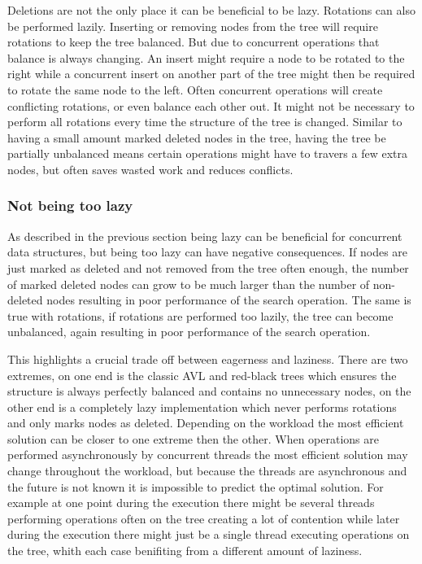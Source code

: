 \documentclass[10pt]{sigplanconf}
\begin{document}
Deletions are not the only place it can be beneficial to be lazy.
Rotations can also be performed lazily.
Inserting or removing nodes from the tree will require rotations to keep the tree balanced.
But due to concurrent operations that balance is always changing.
An insert might require a node to be rotated to the right while a concurrent insert on another part of the tree might then be required to rotate the same node to the left.
Often concurrent operations will create conflicting rotations, or even balance each other out.
It might not be necessary to perform all rotations every time the structure of the tree is changed.
Similar to having a small amount marked deleted nodes in the tree, having the tree be partially unbalanced means certain operations might have to travers a few extra nodes, but
often saves wasted work and reduces conflicts.

\subsubsection{Not being too lazy}
As described in the previous section being lazy can be beneficial for concurrent data structures, but being too lazy can have negative consequences.
If nodes are just marked as deleted and not removed from the tree often enough, the number of marked deleted nodes can grow to be much larger than the
number of non-deleted nodes resulting in poor performance of the search operation.
The same is true with rotations, if rotations are performed too lazily, the tree can become unbalanced, again resulting in poor performance of the search operation.

This highlights a crucial trade off between eagerness and laziness.
There are two extremes, on one end is the classic AVL and red-black trees which ensures the structure is always perfectly balanced and contains no unnecessary nodes, on the other end is a completely
lazy implementation which never performs rotations and only marks nodes as deleted.
Depending on the workload the most efficient solution can be closer to one extreme then the other.
When operations are performed asynchronously by concurrent threads the most efficient solution may change throughout the workload,
but because the threads are asynchronous and the future is not known it is impossible to predict the optimal solution.
For example at one point during the execution there might be several threads performing operations often on the tree creating a lot of contention
while later during the execution there might just be a single thread executing operations on the tree, whith each case benifiting from a different amount of laziness.
\end{document}
